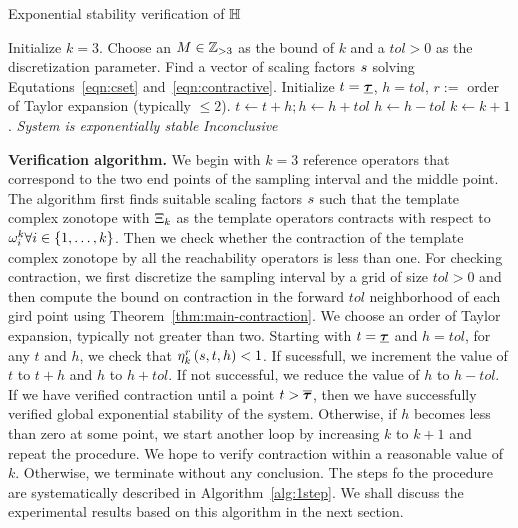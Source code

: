 %
 \begin{algorithm}
\caption{Exponential stability verification of $\mathbb{H}$}
\label{alg:1step}
\begin{algorithmic}[1]
\State Initialize $k=3$.
\State Choose an $M\in\mathbb{Z}_{>3}$ as the bound of $k$ and a $tol>0$ as
the discretization parameter.
\State Find a vector of scaling factors $s$ solving Equtations~\ref{eqn:cset} and~\ref{eqn:contractive}.
\State Initialize $t=\bm{\underline{\tau}}$, $h=tol$, $r:=$ order of Taylor
expansion (typically $\leq 2$).
\State $t\gets t+h; h\gets h+tol$
\Else
\State $h\gets h-tol$
\EndIf
{}
\State $k\gets k+1$.  
\EndIf
\EndWhile
{}
\State \emph{System is exponentially stable}
\Else
\State \emph{Inconclusive}
\EndIf
\end{algorithmic}
 \end{algorithm}
%
{\bf Verification algorithm.} We begin with $k=3$ reference
 operators that correspond to the two end points of the sampling
 interval and the middle point.  The algorithm first finds suitable
 scaling factors $s$ such that the template complex zonotope with
 $\Xi_k$ as the template operators contracts with respect to
 $\omega_i^k\forall i\in\left\{1,\ldots,k\right\}$.  Then we check whether the
 contraction of the template complex zonotope by all the reachability
 operators is less than one. For checking contraction, we first
 discretize the sampling interval by a grid of size $tol>0$ and then
 compute the bound on contraction in the forward $tol$ neighborhood of
 each gird point using Theorem~\ref{thm:main-contraction}.  We choose
 an order of Taylor expansion, typically not greater than two.
 Starting with $t=\bm{\underline{\tau}}$ and $h=tol$, for any $t$ and $h$, we check
 that $\eta_{k}^{r}\left(s,t,h\right)<1$.  If sucessfull, we increment the
 value of $t$ to $t+h$ and $h$ to $h+tol$.  If not successful, we
 reduce the value of $h$ to $h-tol$.  If we have verified contraction
 until a point $t>\bm{\overline{\tau}}$, then we have successfully verified global
 exponential stability of the system.  Otherwise, if $h$ becomes less
 than zero at some point, we start another loop by increasing $k$ to
 $k+1$ and repeat the procedure.  We hope to verify contraction within
 a reasonable value of $k$.  Otherwise, we terminate without any
 conclusion.  The steps fo the procedure are systematically described
 in Algorithm~\ref{alg:1step}.  We shall discuss the experimental results
 based on this algorithm in the next section.
%

